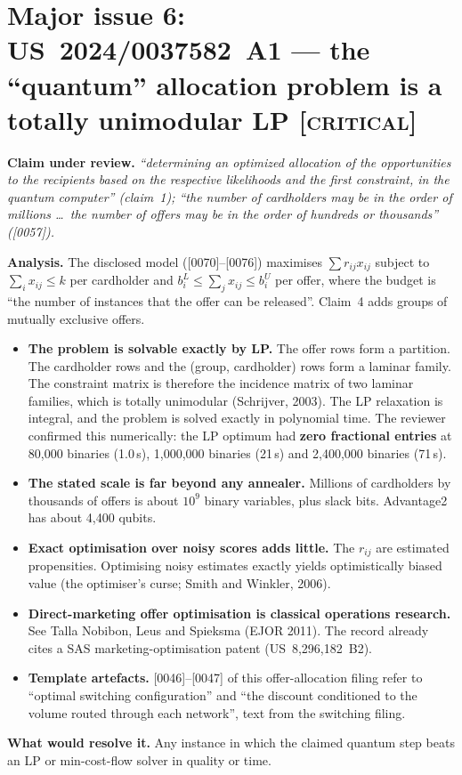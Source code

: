 \documentclass[10pt,a4paper]{article}
\newcommand{\claim}[1]{\noindent\textbf{Claim under review.} \emph{#1}\par\smallskip}
\newcommand{\sev}[1]{\textsc{\color{BrickRed}[#1]}}
\newcommand{\req}[1]{\noindent\textbf{What would resolve it.} #1\par}
\begin{document}
\section{Major issue 6: US~2024/0037582~A1 --- the ``quantum'' allocation problem is a totally unimodular LP \sev{critical}}\label{sec:alloc}
\claim{``determining an optimized allocation of the opportunities to the recipients based on the respective likelihoods and the first constraint, in the quantum computer'' (claim~1); ``the number of cardholders may be in the order of millions \ldots\ the number of offers may be in the order of hundreds or thousands'' ([0057]).}

\noindent\textbf{Analysis.} The disclosed model ([0070]--[0076]) maximises $\sum r_{ij}x_{ij}$ subject to $\sum_i x_{ij}\le k$ per cardholder and $b^L_i\le\sum_jx_{ij}\le b^U_i$ per offer, where the budget is ``the number of instances that the offer can be released''. Claim~4 adds groups of mutually exclusive offers.
\begin{itemize}
  \item \textbf{The problem is solvable exactly by LP.} The offer rows form a partition. The cardholder rows and the (group, cardholder) rows form a laminar family. The constraint matrix is therefore the incidence matrix of two laminar families, which is totally unimodular (Schrijver, 2003). The LP relaxation is integral, and the problem is solved exactly in polynomial time. The reviewer confirmed this numerically: the LP optimum had \textbf{zero fractional entries} at 80,000 binaries (1.0\,s), 1,000,000 binaries (21\,s) and 2,400,000 binaries (71\,s).
  \item \textbf{The stated scale is far beyond any annealer.} Millions of cardholders by thousands of offers is about $10^9$ binary variables, plus slack bits. Advantage2 has about 4,400 qubits.
  \item \textbf{Exact optimisation over noisy scores adds little.} The $r_{ij}$ are estimated propensities. Optimising noisy estimates exactly yields optimistically biased value (the optimiser's curse; Smith and Winkler, 2006).
  \item \textbf{Direct-marketing offer optimisation is classical operations research.} See Talla Nobibon, Leus and Spieksma (EJOR 2011). The record already cites a SAS marketing-optimisation patent (US~8,296,182~B2).
  \item \textbf{Template artefacts.} [0046]--[0047] of this offer-allocation filing refer to ``optimal switching configuration'' and ``the discount conditioned to the volume routed through each network'', text from the switching filing.
\end{itemize}
\req{Any instance in which the claimed quantum step beats an LP or min-cost-flow solver in quality or time.}
\end{document}
